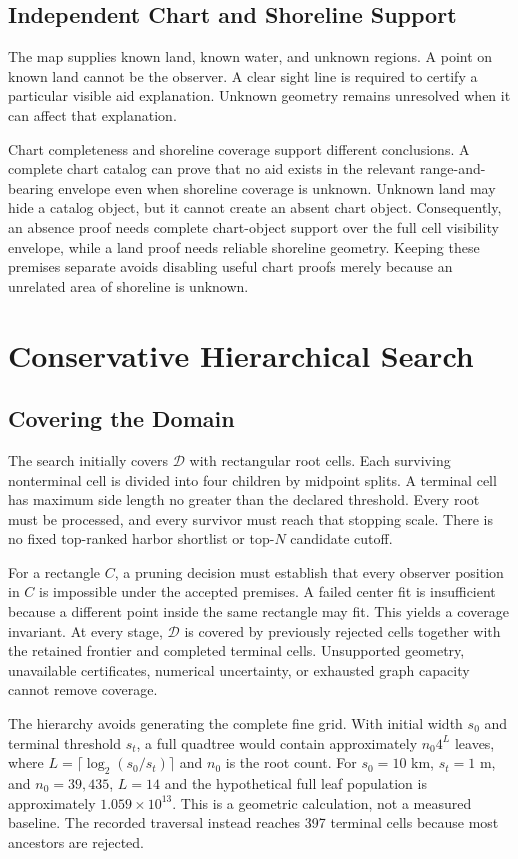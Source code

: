 \documentclass[conference]{IEEEtran}
\begin{document}
\subsection{Independent Chart and Shoreline Support}
The map supplies known land, known water, and unknown regions. A point on known land cannot be the observer. A clear sight line is required to certify a particular visible aid explanation. Unknown geometry remains unresolved when it can affect that explanation.

Chart completeness and shoreline coverage support different conclusions. A complete chart catalog can prove that no aid exists in the relevant range-and-bearing envelope even when shoreline coverage is unknown. Unknown land may hide a catalog object, but it cannot create an absent chart object. Consequently, an absence proof needs complete chart-object support over the full cell visibility envelope, while a land proof needs reliable shoreline geometry. Keeping these premises separate avoids disabling useful chart proofs merely because an unrelated area of shoreline is unknown.

\section{Conservative Hierarchical Search}
\subsection{Covering the Domain}
The search initially covers $\mathcal D$ with rectangular root cells. Each surviving nonterminal cell is divided into four children by midpoint splits. A terminal cell has maximum side length no greater than the declared threshold. Every root must be processed, and every survivor must reach that stopping scale. There is no fixed top-ranked harbor shortlist or top-$N$ candidate cutoff.

For a rectangle $C$, a pruning decision must establish that every observer position in $C$ is impossible under the accepted premises. A failed center fit is insufficient because a different point inside the same rectangle may fit. This yields a coverage invariant. At every stage, $\mathcal D$ is covered by previously rejected cells together with the retained frontier and completed terminal cells. Unsupported geometry, unavailable certificates, numerical uncertainty, or exhausted graph capacity cannot remove coverage.

The hierarchy avoids generating the complete fine grid. With initial width $s_0$ and terminal threshold $s_t$, a full quadtree would contain approximately $n_0 4^L$ leaves, where $L=\lceil\log_2(s_0/s_t)\rceil$ and $n_0$ is the root count. For $s_0=10$ km, $s_t=1$ m, and $n_0=39{,}435$, $L=14$ and the hypothetical full leaf population is approximately $1.059\times10^{13}$. This is a geometric calculation, not a measured baseline. The recorded traversal instead reaches 397 terminal cells because most ancestors are rejected.
\end{document}
